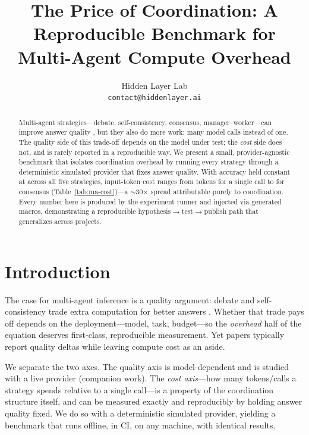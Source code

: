 \documentclass{article}
\title{The Price of Coordination: A Reproducible Benchmark for\\
Multi-Agent Compute Overhead}
\author{
  Hidden Layer Lab \\
  \texttt{contact@hiddenlayer.ai}
}
\date{}
\begin{document}
\maketitle

\begin{abstract}
Multi-agent strategies---debate, self-consistency, consensus, manager--worker---can
improve answer quality \cite{du2023debate,wang2023selfconsistency}, but they also do more
work: many model calls instead of one. The quality side of this trade-off depends on the
model under test; the \emph{cost} side does not, and is rarely reported in a reproducible
way. We present a small, provider-agnostic benchmark that isolates coordination overhead
by running every strategy through a deterministic simulated provider that fixes answer
quality. With accuracy held constant at \maSingleAccuracy{} across all five strategies,
input-token cost ranges from \maSingleTokensIn{} tokens for a single call to
\maConsensusTokensIn{} for consensus (Table~\ref{tab:ma-cost})---a $\sim$30$\times$ spread
attributable purely to coordination. Every number here is produced by the experiment
runner and injected via generated macros, demonstrating a reproducible
hypothesis$\rightarrow$test$\rightarrow$publish path that generalizes across projects.
\end{abstract}

\section{Introduction}
The case for multi-agent inference is a quality argument: debate and self-consistency
trade extra computation for better answers \cite{du2023debate,wang2023selfconsistency}.
Whether that trade pays off depends on the deployment---model, task, budget---so the
\emph{overhead} half of the equation deserves first-class, reproducible measurement.
Yet papers typically report quality deltas while leaving compute cost as an aside.

We separate the two axes. The quality axis is model-dependent and is studied with a live
provider (companion work). The \emph{cost axis}---how many tokens/calls a strategy spends
relative to a single call---is a property of the coordination structure itself, and can
be measured exactly and reproducibly by holding answer quality fixed. We do so with a
deterministic simulated provider, yielding a benchmark that runs offline, in CI, on any
machine, with identical results.
\end{document}
